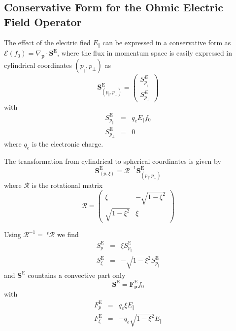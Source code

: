 \subsection{Conservative Form for the Ohmic Electric Field Operator}

The effect of the electric fied $E_{\Vert }$ can be expressed in a
conservative form as $\mathcal{E}(f_{0})=\nabla _{\mathbf{p}}\cdot \mathbf{S}%
^{\text{E}}$, where the flux in momentum space is easily expressed in
cylindrical coordinates $\left( p_{_{\Vert }},p_{\bot }\right) $ as
\begin{equation}
\mathbf{S}_{\left( p_{\Vert },p_{\bot }\right) }^{\text{E}}=\left(
\begin{array}{l}
S_{p_{_{\Vert }}}^{E} \\
S_{p_{\bot }}^{E}
\end{array}
\right)
\end{equation}
with
\begin{eqnarray}
S_{p_{\Vert }}^{\text{E}} &=&q_{e}E_{\Vert }f_{0} \\
S_{p_{\bot }}^{\text{E}} &=&0
\end{eqnarray}
where $q_{e}$ is the electronic charge.

The transformation from cylindrical to spherical coordinates is given by
\begin{equation}
\mathbf{S}_{\left( p,\xi \right) }^{\text{E}}=\mathcal{R}^{-1}\mathbf{S}%
_{\left( p_{\Vert },p_{\bot }\right) }^{\text{E}}
\end{equation}
where $\mathcal{R}$ is the rotational matrix
\[
\mathcal{R}=\left(
\begin{array}{ll}
\xi & -\sqrt{1-\xi ^{2}} \\
\sqrt{1-\xi ^{2}} & \xi
\end{array}
\right)
\]

Using $\mathcal{R}^{-1}=$ $^{t}\mathcal{R}$ we find
\begin{eqnarray}
S_{p}^{\text{E}} &=&\xi S_{p_{\Vert }}^{\text{E}} \\
S_{\xi }^{\text{E}} &=&-\sqrt{1-\xi ^{2}}S_{p_{\Vert }}^{\text{E}}
\end{eqnarray}
and $\mathbf{S}^{\text{E}}$ countains a convective part only
\begin{equation}
\mathbf{S}^{\text{E}}=\mathbf{F}_{\mathbf{p}}^{\text{E}}f_{0}  \label{elec}
\end{equation}
with
\begin{eqnarray*}
F_{p}^{\text{E}} &=&q_{e}\xi E_{\Vert } \\
F_{\xi }^{\text{E}} &=&-q_{e}\sqrt{1-\xi ^{2}}E_{\Vert }
\end{eqnarray*}
